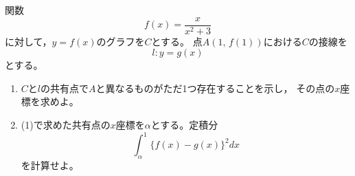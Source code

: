 \documentclass[../../main.tex]{subfiles}
\begin{document}
関数
\[ f(x)=\frac{x}{x^2+3} \]
に対して，$y=f(x)$のグラフを$C$とする。
点$A(1, \, f(1))$における$C$の接線を
\[ l:y=g(x) \]
とする。
\begin{enumerate}
  \item$C$と$l$の共有点で$A$と異なるものがただ1つ存在することを示し，
    その点の$x$座標を求めよ。
  \item(1)で求めた共有点の$x$座標を$\alpha$とする。定積分
    \[ \int_{\alpha}^1 { \{ f(x)-g(x) \} }^2 dx \]
    を計算せよ。
\end{enumerate}
\end{document}
